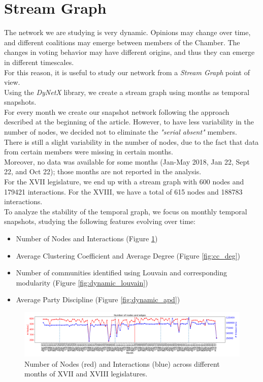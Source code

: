 \section{Stream Graph}

The network we are studying is very dynamic. Opinions may change over time, and different coalitions may emerge between members of the Chamber. The changes in voting behavior may have different origins, and thus they can emerge in different timescales.\\
For this reason, it is useful to study our network from a \textit{Stream Graph} point of view.\\
Using the \textit{DyNetX} library, we create a stream graph using months as temporal snapshots.\\
For every month we create our snapshot network following the approach described at the beginning of the article. However, to have less variability in the number of nodes, we decided not to eliminate the \textit{"serial absent"} members.\\
There is still a slight variability in the number of nodes, due to the fact that data from certain members were missing in certain months.\\ Moreover, no data was available for some months (Jan-May 2018, Jan 22, Sept 22, and Oct 22); those months are not reported in the analysis.\\

For the XVII legislature, we end up with a stream graph with 600 nodes and 179421 interactions.
For the XVIII, we have a total of 615 nodes and 188783 interactions.\\

To analyze the stability of the temporal graph, we focus on monthly temporal snapshots, studying the following features evolving over time:
\begin{itemize}
    \item Number of Nodes and  Interactions (Figure \ref{fig:dynamic_nodes_edges})
    \item Average Clustering Coefficient and Average Degree (Figure \ref{fig:cc_deg})    
    \item Number of communities identified using Louvain and corresponding modularity (Figure \ref{fig:dynamic_louvain})
    \item  Average Party Discipline (Figure \ref{fig:dynamic_apd})
\end{itemize}

\begin{figure}[h]
  \centering
  \includegraphics[width=\linewidth]{img/dynamic_nodes_edges_tot.png}
  \caption{Number of Nodes (red) and Interactions (blue) across different months of XVII and XVIII legislatures.}
  \label{fig:dynamic_nodes_edges}
\end{figure}




